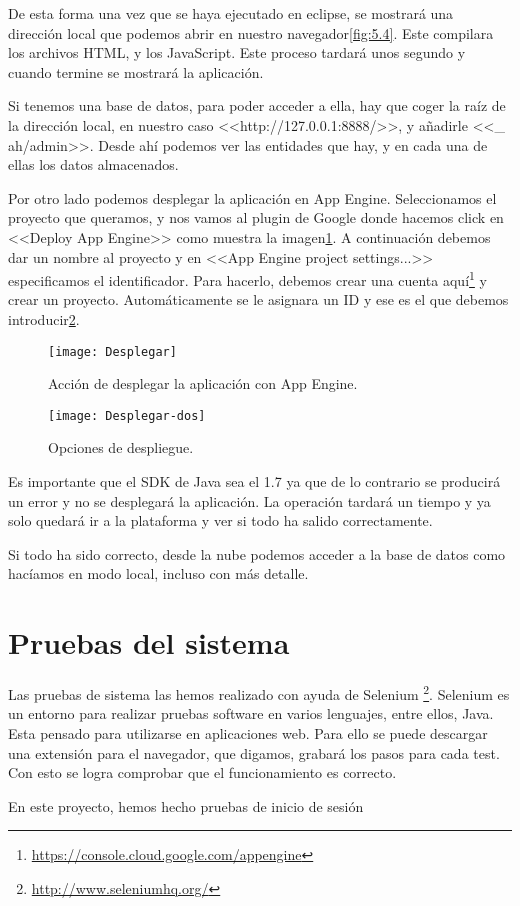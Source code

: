De esta forma una vez que se haya ejecutado en eclipse, se mostrará una dirección local que podemos abrir en nuestro navegador\ref{fig:5.4}. Este compilara los archivos HTML, y los JavaScript. Este proceso tardará unos segundo y cuando termine se mostrará la aplicación.

Si tenemos una base de datos, para poder acceder a ella, hay que coger la raíz de la dirección local, en nuestro caso <<http://127.0.0.1:8888/>>, y añadirle <<\_ ah/admin>>. Desde ahí podemos ver las entidades que hay, y en cada una de ellas los datos almacenados.


Por otro lado podemos desplegar la aplicación en App Engine. Seleccionamos el proyecto que queramos, y nos vamos al plugin de Google donde hacemos click en <<Deploy App Engine>> como muestra la imagen\ref{fig:5.5}. A continuación debemos dar un nombre al proyecto y en <<App Engine project settings...>> especificamos el identificador. Para hacerlo, debemos crear una cuenta aquí\footnote{\url{https://console.cloud.google.com/appengine}} y crear un proyecto. Automáticamente se le asignara un ID y ese es el que debemos introducir\ref{fig:5.6}. 
\begin{figure}
\centering
\texttt{[image: Desplegar]}
\caption{Acción de desplegar la aplicación con App Engine.}
\label{fig:5.5}
\end{figure}

\begin{figure}
\centering
\texttt{[image: Desplegar-dos]}
\caption{Opciones de despliegue.}
\label{fig:5.6}
\end{figure}

Es importante que el SDK de Java sea el 1.7 ya que de lo contrario se producirá un error y no se desplegará la aplicación. La operación tardará un tiempo y ya solo quedará ir a la plataforma y ver si todo ha salido correctamente.

Si todo ha sido correcto, desde la nube podemos acceder a la base de datos como hacíamos en modo local, incluso con más detalle.

\section{Pruebas del sistema}


Las pruebas de sistema las hemos realizado con ayuda de Selenium \footnote{\url{http://www.seleniumhq.org/}}. Selenium es un entorno para realizar pruebas software en varios lenguajes, entre ellos, Java. Esta pensado para utilizarse en aplicaciones web. Para ello se puede descargar una extensión para el navegador, que digamos, grabará los pasos para cada test. Con esto se logra comprobar que el funcionamiento es correcto.

En este proyecto, hemos hecho pruebas de inicio de sesión